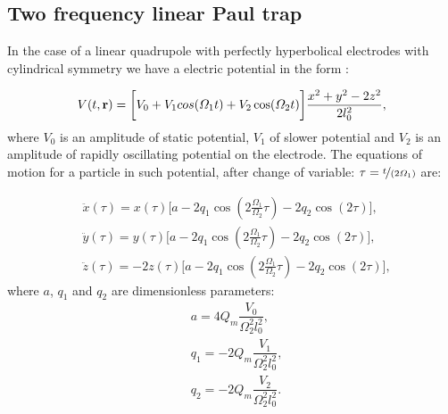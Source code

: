 \chapter{}
\label{chap:math}


\section{Two frequency linear Paul trap}
\label{sec:two frequency trap}
In the case of a linear quadrupole with perfectly hyperbolical electrodes with cylindrical symmetry we have a electric potential in the form \cite{leefer2017investigation}
:

\begin{equation}
	V(t, \vb{r}) = \bigg[ V_0 + V_1 cos(\Omega_1 t) + V_2 \cos(\Omega_2 t) \bigg] \frac{x^2 + y^2 - 2 z^2 }{2 l_0^2},
\end{equation}
where $V_0$ is an amplitude of static potential, $V_1$ of slower potential and $V_2$ is an amplitude of rapidly oscillating potential on the electrode. The equations of motion for a particle in such potential, after change of variable: $\tau = \nicefrac{t}{(2 \Omega_1)}$ are:

\begin{subequations}
\begin{align}
	& \ddot{x}(\tau) = x(\tau) \bigg[ a - 2 q_1 \cos\left(2\frac{\Omega_1}{\Omega_2} \tau \right) - 2 q_2 \cos(2\tau) \bigg], \\
	& \ddot{y}(\tau) = y(\tau) \bigg[ a - 2 q_1 \cos\left(2\frac{\Omega_1}{\Omega_2} \tau \right) - 2 q_2 \cos(2\tau) \bigg], \\
	\label{studied eq of motion}
	& \ddot{z}(\tau) = -2z(\tau) \bigg[ a - 2 q_1 \cos\left(2\frac{\Omega_1}{\Omega_2} \tau \right) - 2 q_2 \cos(2\tau) \bigg],
\end{align}
\end{subequations}
where $a$, $q_1$ and $q_2$ are dimensionless parameters:
\begin{subequations}
\begin{align}
	& a = 4 Q_m \dfrac{V_0}{\Omega_2^2 l_0^2}, \\
	& q_1 = -2 Q_m \dfrac{V_1}{\Omega_2^2 l_0^2}, \\
	& q_2 = -2 Q_m \dfrac{V_2}{\Omega_2^2 l_0^2}.
\end{align}
\end{subequations}

